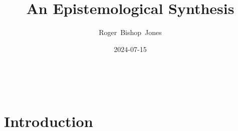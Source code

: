 \documentclass[10pt,titlepage]{book}
\title{\bf\LARGE An Epistemological Synthesis}
\author{Roger~Bishop~Jones}
\date{\small 2024-07-15}
\newcommand{\ignore}[1]{}
\begin{document}

%
                               
\begin{titlepage}
\maketitle





\end{titlepage}

\ \

\ignore{
\begin{centering}
{}
\end{centering}
}%

\setcounter{tocdepth}{2}
{\parskip-0pt\tableofcontents}




\chapter{Introduction}




\ignore{

\chapter{Varieties of Epistemology}



\chapter{Logical Truth}


}%

{}



\label{index}
{\twocolumn[]
{\small\printindex}}





\end{document}
